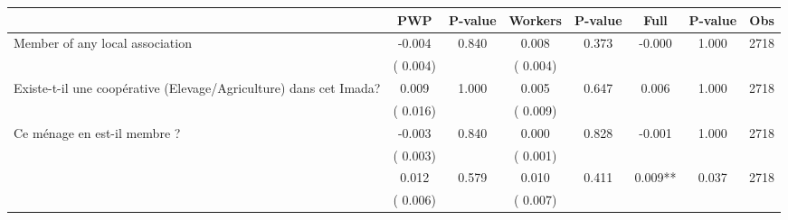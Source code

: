 
\begin{tabular}{l*{7}{c}}\hline&\multicolumn{1}{c}{PWP}&\multicolumn{1}{c}{P-value}&\multicolumn{1}{c}{Workers}&\multicolumn{1}{c}{P-value}&\multicolumn{1}{c}{Full}&\multicolumn{1}{c}{P-value}&\multicolumn{1}{c}{Obs} \\ \hline

 Member of any local association       &             -0.004       &        0.840  &              0.008       &        0.373  &             -0.000       &              1.000 &  2718 \\ 
                       &       (       0.004)             &                               &       (       0.004)                     &                               &                                               &                                &                      \\ 

 Existe-t-il une coopérative (Elevage/Agriculture) dans cet Imada?       &              0.009       &        1.000  &              0.005       &        0.647  &              0.006       &              1.000 &  2718 \\ 
                       &       (       0.016)             &                               &       (       0.009)                     &                               &                                               &                                &                      \\ 

 Ce ménage en est-il membre ?       &             -0.003       &        0.840  &              0.000       &        0.828  &             -0.001       &              1.000 &  2718 \\ 
                       &       (       0.003)             &                               &       (       0.001)                     &                               &                                               &                                &                      \\ 

        &              0.012       &        0.579  &              0.010       &        0.411  &              0.009**       &              0.037 &  2718 \\ 
                       &       (       0.006)             &                               &       (       0.007)                     &                               &                                               &                                &                      \\ 


\end{tabular}
